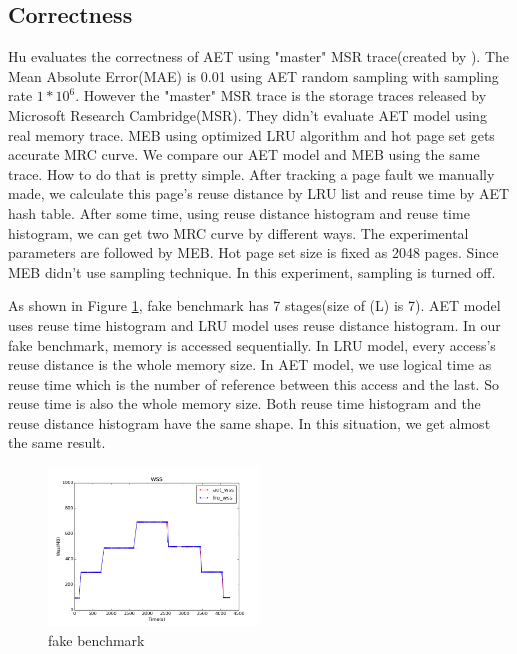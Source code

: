\documentclass[10pt,twocolumn]{article}
\begin{document}
\subsection{Correctness}
Hu\cite{aet} evaluates the correctness of AET using "master" MSR trace(created by \cite{Wires2014Characterizing}). The Mean Absolute Error(MAE) is 0.01 using AET random sampling with sampling rate $1*10^6$. However the "master" MSR trace is the storage traces released by Microsoft Research Cambridge(MSR)\cite{Narayanan2008Write}. They didn't evaluate AET model using real memory trace. MEB\cite{Wang2016Dynamic} using optimized LRU algorithm and hot page set gets accurate MRC curve. We compare our AET model and MEB using the same trace. How to do that is pretty simple. After tracking a page fault we manually made, we calculate this page's reuse distance by LRU list and reuse time by AET hash table. After some time, using reuse distance histogram and reuse time histogram, we can get two MRC curve by different ways. The experimental parameters are followed by MEB\cite{Wang2016Dynamic}. Hot page set size is fixed as 2048 pages. Since MEB didn't use sampling technique. In this experiment, sampling is turned off.

As shown in Figure \ref{fig4}, fake benchmark has 7 stages(size of (L) is 7). AET model uses reuse time histogram and LRU model uses reuse distance histogram. In our fake benchmark, memory is accessed sequentially. In LRU model, every access's reuse distance is the whole memory size. In AET model, we use logical time as reuse time which is the number of reference between this access and the last. So reuse time is also the whole memory size. Both reuse time histogram and the reuse distance histogram have the same shape. In this situation, we get almost the same result.

\begin{figure}
	\caption{fake benchmark}
	\label{fig4}
	\includegraphics[width=0.5\textwidth]{img/aet_lru_cmp/aet_lru_cmp_fakestage.png}
\end{figure} 
\end{document}
